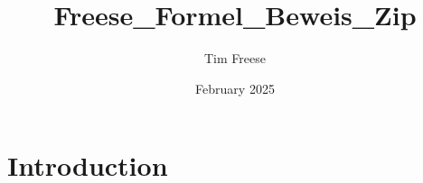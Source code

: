 \documentclass{article}
\title{Freese_Formel_Beweis_Zip}
\author{Tim Freese}
\date{February 2025}
\begin{document}
\maketitle

\section{Introduction}
\end{document}
